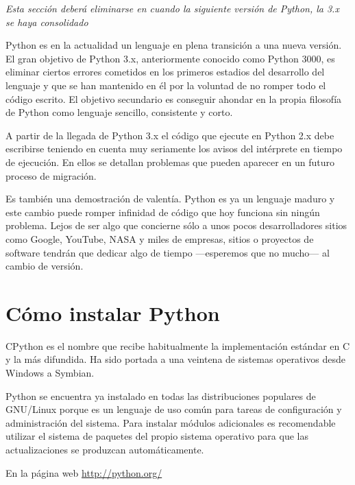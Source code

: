 \documentclass[a4paper,10pt]{article}
\begin{document}
\emph{Esta sección deberá eliminarse en cuando la siguiente versión de
Python, la 3.x se haya consolidado}

Python es en la actualidad un lenguaje en plena transición a una nueva
versión.  El gran objetivo de Python 3.x, anteriormente conocido como
Python 3000, es eliminar ciertos errores cometidos en los primeros
estadios del desarrollo del lenguaje y que se han mantenido en él por
la voluntad de no romper todo el código escrito. El objetivo
secundario es conseguir ahondar en la propia filosofía de Python como
lenguaje sencillo, consistente y corto.

A partir de la llegada de Python 3.x el código que ejecute en Python
2.x debe escribirse teniendo en cuenta muy seriamente los avisos del
intérprete en tiempo de ejecución.  En ellos se detallan problemas que
pueden aparecer en un futuro proceso de migración.

Es también una demostración de valentía.  Python es ya un lenguaje
maduro y este cambio puede romper infinidad de código que hoy funciona
sin ningún problema.  Lejos de ser algo que concierne sólo a unos
pocos desarrolladores sitios como Google, YouTube, NASA y miles de
empresas, sitios o proyectos de software tendrán que dedicar algo de
tiempo ---esperemos que no mucho--- al cambio de versión.

\section{Cómo instalar Python}
\label{sec:instalar}

CPython es el nombre que recibe habitualmente la implementación
estándar en C y la más difundida. Ha sido portada a una veintena de
sistemas operativos desde Windows a Symbian.

Python se encuentra ya instalado en todas las distribuciones populares
de GNU/Linux porque es un lenguaje de uso común para tareas de
configuración y administración del sistema.  Para instalar módulos
adicionales es recomendable utilizar el sistema de paquetes del propio
sistema operativo para que las actualizaciones se produzcan
automáticamente.

En la página web \url{http://python.org/}
\end{document}
